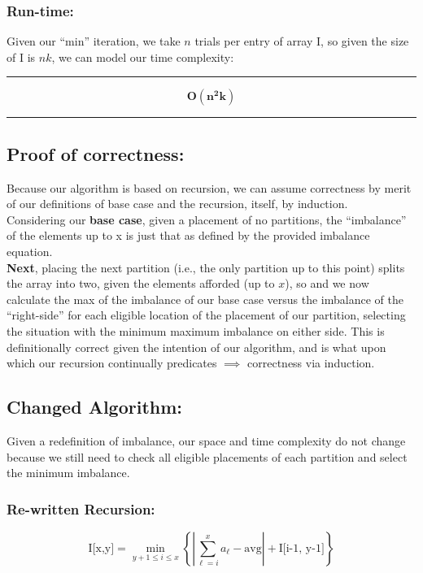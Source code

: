 \documentclass[conference]{styles/acmsiggraph}
\newcommand{\?}{\stackrel{?}{=}}
\begin{document}
\subsubsection*{Run-time:}
Given our \enquote{min} iteration, we take $n$ trials per entry of array I, so given the size of I is $nk$, we can model our time complexity:\\

\rule{\textwidth}{0.4pt}
$$\mathbf{O(n^2k)}$$
\rule{\textwidth}{0.4pt}

\subsection{Proof of correctness:}
Because our algorithm is based on recursion, we can assume correctness by merit of our definitions of base case and the recursion, itself, by induction. \\

Considering our \textbf{base case}, given a placement of no partitions, the \enquote{imbalance} of the elements up to x is just that as defined by the provided imbalance equation. \\

\textbf{Next}, placing the next partition (i.e., the only partition up to this point) splits the array into two, given the elements afforded (up to $x$), so and we now calculate the max of the imbalance of our base case versus the imbalance of the \enquote{right-side} for each eligible location of the placement of our partition, selecting the situation with the minimum maximum imbalance on either side.  This is definitionally correct given the intention of our algorithm, and is what upon which our recursion continually predicates $\implies$ correctness via induction.

\subsection{Changed Algorithm:}

Given a redefinition of imbalance, our space and time complexity do not change because we still need to check all eligible placements of each partition and select the minimum imbalance.

\subsubsection*{Re-written Recursion:}
$$\text{I[x,y]} = \min_{y+1 \leq i \leq x} \left\{ \left | \sum^{x}_{\ell = i} a_\ell - \text{avg} \right | + \text{I[i-1, y-1]}\right \}$$
\end{document}
